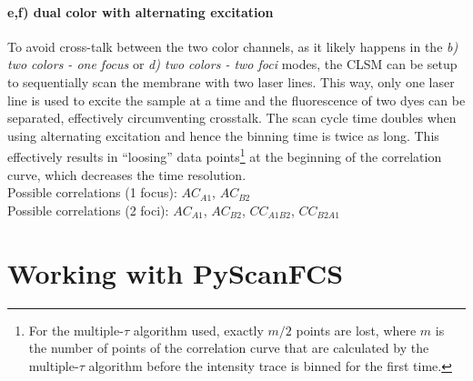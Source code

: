 \paragraph{e,f) dual color with alternating excitation}
To avoid cross-talk between the two color channels, as it likely happens in the \textit{b) two colors - one focus} or \textit{d) two colors - two foci}  modes, the CLSM can be setup to sequentially scan the membrane with two laser lines. This way, only one laser line is used to excite the sample at a time and the fluorescence of two dyes can be separated, effectively circumventing crosstalk. The scan cycle time  doubles when using alternating excitation and hence the binning time is twice as long. This effectively results in ``loosing'' data points\footnote{For the multiple-$\tau$ algorithm used, exactly $m/2$ points are lost, where $m$ is the number of points of the correlation curve that are calculated by the multiple-$\tau$ algorithm before the intensity trace is binned for the first time.}  at the beginning of the correlation curve, which decreases the time resolution.\\
Possible correlations (1 focus): $AC_{A1}$, $AC_{B2}$\\
Possible correlations (2 foci): $AC_{A1}$, $AC_{B2}$, $CC_{A1B2}$, $CC_{B2A1}$

\begin{figure}[h]
\centering
{} \qquad
{} 
\end{figure}

\section{Working with PyScanFCS}

